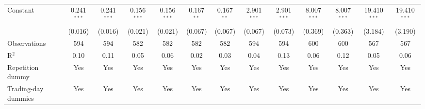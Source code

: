 \begin{tabular}{lcccccccccccc}
   Constant            & 0.241$^{***}$  & 0.241$^{***}$  & 0.156$^{***}$ & 0.156$^{***}$ & 0.167$^{**}$ & 0.167$^{**}$ & 2.901$^{***}$ & 2.901$^{***}$  & 8.007$^{***}$ & 8.007$^{***}$   & 19.410$^{***}$ & 19.410$^{***}$\\   
                       & (0.016)        & (0.016)        & (0.021)       & (0.021)       & (0.067)      & (0.067)      & (0.067)       & (0.073)        & (0.369)       & (0.363)         & (3.184)        & (3.190)\\   
   \midrule
   Observations        & 594            & 594            & 582           & 582           & 582          & 582          & 594           & 594            & 600           & 600             & 567            & 567\\  
   R$^2$               & 0.10           & 0.11           & 0.05          & 0.06          & 0.02         & 0.03         & 0.04          & 0.13           & 0.06          & 0.12            & 0.05           & 0.06\\  
   Repetition dummy    & Yes            & Yes            & Yes           & Yes           & Yes          & Yes          & Yes           & Yes            & Yes           & Yes             & Yes            & Yes\\  
   Trading-day dummies & Yes            & Yes            & Yes           & Yes           & Yes          & Yes          & Yes           & Yes            & Yes           & Yes             & Yes            & Yes\\  
   \midrule \midrule
\end{tabular}
